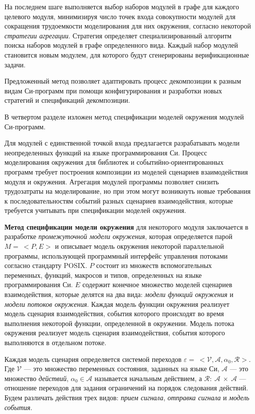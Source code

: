 \documentclass[%
autoref,
colorlinks,  
facsimile,   %
]{disser}
\begin{document}
На последнем шаге выполняется выбор наборов модулей в графе для каждого целевого модуля, минимизируя число точек входа совокупности модулей для сокращения трудоемкости моделирования для них окружения, согласно некоторой \textit{стратегии агрегации}.
Стратегия определяет специализированный алгоритм поиска наборов модулей в графе определенного вида.
Каждый набор модулей становится новым модулем, для которого будут сгенерированы верификационные задачи.

Предложенный метод позволяет адаптировать процесс декомпозиции к разным видам Си-программ при помощи конфигурирования и разработки новых стратегий и спецификаций декомпозиции.

В четвертом разделе изложен метод спецификации моделей окружения модулей Си-программ.

Для модулей с единственной точкой входа предлагается разрабатывать модели неопределенных функций на языке программирования Си.
Процесс моделирования окружения для библиотек и событийно-ориентированных программ требует построения композиции из моделей сценариев взаимодействия модуля и окружения.
Агрегация модулей программы позволяет снизить трудозатраты на моделирование, но при этом могут возникнуть новые требования к последовательностям событий разных сценариев взаимодействия, которые требуется учитывать при спецификации моделей окружения.

\textbf{Метод спецификации модели окружения} для некоторого модуля заключается в разработке \textit{промежуточной модели окружения}, которая определяется парой $M =~<P, E>$ и описывает модель окружения некоторой параллельной программы, использующей программный интерфейс управления потоками согласно стандарту POSIX.
$P$ состоит из множеств вспомогательных переменных, функций, макросов и типов, определенных на языке программирования Си.
$E$ содержит конечное множество моделей сценариев взаимодействия, которые делятся на два вида: \textit{модели функций окружения} и \textit{модели потоков окружения}.
Каждая модель функции окружения реализует модель сценария взаимодействия, события которого происходят во время выполнения некоторой функции, определенной в окружении.
Модель потока окружения реализует модель сценария взаимодействия, события которого выполняются в отдельном потоке.

Каждая модель сценария определяется системой переходов \break $\varepsilon =~<\mathcal{V}, \mathcal{A}, \alpha_0 ,\mathcal{R}>$.
Где $\mathcal{V}$ --- это множество переменных состояния, заданных на языке Си, $\mathcal{A}$ --- это множество \textit{действий}, $\alpha_0 \in \mathcal{A}$ называется начальным действием, а $\mathcal{R}:~ \mathcal{A}~\times~\mathcal{A}$ --- отношение переходов для задания ограничений на порядок следования действий.
Будем различать действия трех видов: \textit{прием сигнала}, \textit{отправка сигнала} и \textit{модель события}.
\end{document}
